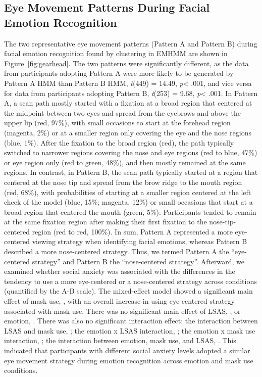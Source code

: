 \subsection{Eye Movement Patterns During Facial Emotion Recognition}
The two representative eye movement patterns (Pattern A and Pattern B) during facial emotion recognition found by clustering in EMHMM are shown in Figure~\ref{fig:gearhead}. The two patterns were significantly different, as the data from participants adopting Pattern A were more likely to be generated by Pattern A HMM than Pattern B HMM, \textit{t}(449) = 14.49, \textit{p}< .001, and vice versa for data from participants adopting Pattern B, \textit{t}(253) = 9.68, \textit{p}< .001. In Pattern A, a scan path mostly started with a fixation at a broad region that centered at the midpoint between two eyes and spread from the eyebrows and above the upper lip (red, 97\%), with small occasions to start at the forehead region (magenta, 2\%) or at a smaller region only covering the eye and the nose regions (blue, 1\%). After the fixation to the broad region (red), the path typically switched to narrower regions covering the nose and eye regions (red to blue, 47\%) or eye region only (red to green, 48\%), and then mostly remained at the same regions. In contrast, in Pattern B, the scan path typically started at a region that centered at the nose tip and spread from the brow ridge to the mouth region (red, 68\%), with probabilities of starting at a smaller region centered at the left cheek of the model (blue, 15\%; magenta, 12\%) or small occasions that start at a broad region that centered the mouth (green, 5\%). Participants tended to remain at the same fixation region after making their first fixation to the nose-tip-centered region (red to red, 100\%).  In sum, Pattern A represented a more eye-centered viewing strategy when identifying facial emotions, whereas Pattern B described a more nose-centered strategy. Thus, we termed Pattern A the “eye-centered strategy” and Pattern B the “nose-centered strategy”. Afterward, we examined whether social anxiety was associated with the differences in the tendency to use a more eye-centered or a nose-centered strategy across conditions (quantified by the A-B scale).
The mixed-effect model showed a significant main effect of mask use, , with an overall increase in using eye-centered strategy associated with mask use. There was no significant main effect of LSAS, , or emotion, . There was also no significant interaction effect: the interaction between LSAS and mask use, ; the emotion x LSAS interaction, ; the emotion x mask use interaction, ; the interaction between emotion, mask use, and LSAS, . This indicated that participants with different social anxiety levels adopted a similar eye movement strategy during emotion recognition across emotion and mask use conditions. 
